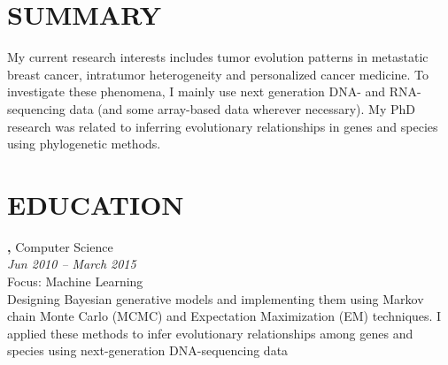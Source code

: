\documentclass[margin, 10pt]{res} %
\begin{document}
\begin{resume}

 
\section{SUMMARY}
My current research interests includes tumor evolution patterns in metastatic breast cancer, intratumor heterogeneity and personalized cancer medicine. To investigate these phenomena, I mainly use next generation DNA- and RNA-sequencing data (and some array-based data wherever necessary). My PhD research was related to inferring evolutionary relationships in genes and species using phylogenetic methods.




\section{EDUCATION}

{\bf \color{Black}{Doctor of Philosophy},} Computer Science \\
{} \hfill \textit{Jun 2010 -- March 2015} \\
Focus: Machine Learning \\
Designing Bayesian generative models and implementing them using Markov chain Monte Carlo (MCMC) and Expectation Maximization (EM) techniques. I applied these methods to infer evolutionary relationships among genes and species using next-generation DNA-sequencing data %


\end{resume}
\end{document}

